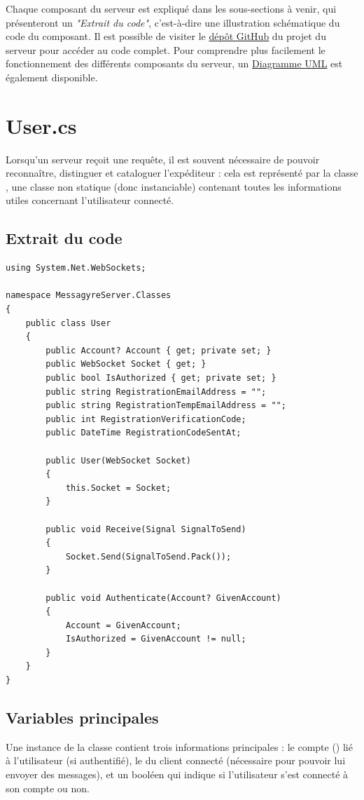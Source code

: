 \documentclass[12pt]{report}
\begin{document}
Chaque composant du serveur est expliqué dans les sous-sections à venir, qui présenteront un \textit{"Extrait du code"}, c’est-à-dire une illustration schématique du code du composant. Il est possible de visiter le \href{https://github.com/Gravi32/MessagyreServer.git}{dépôt GitHub} du projet du serveur pour accéder au code complet.
Pour comprendre plus facilement le fonctionnement des différents composants du serveur, un \href{https://lucid.app/lucidchart/b8dadd52-61fd-468b-8bd6-a81aa133eb02/edit?viewport_loc=-3637\%2C-1769\%2C9681\%2C4831\%2C0_0&invitationId=inv_fa22bca5-082d-4666-b827-15f4adaa3a38}{Diagramme UML} est également disponible.

\section{User.cs}

Lorsqu’un serveur reçoit une requête, il est souvent nécessaire de pouvoir reconnaître, distinguer et cataloguer l’expéditeur : cela est représenté par la classe , une classe non statique (donc instanciable) contenant toutes les informations utiles concernant l’utilisateur connecté.

\subsection{Extrait du code}
\begin{verbatim}
using System.Net.WebSockets;

namespace MessagyreServer.Classes
{
    public class User
    {
        public Account? Account { get; private set; }
        public WebSocket Socket { get; }
        public bool IsAuthorized { get; private set; }
        public string RegistrationEmailAddress = "";
        public string RegistrationTempEmailAddress = "";
        public int RegistrationVerificationCode;
        public DateTime RegistrationCodeSentAt;
        
        public User(WebSocket Socket)
        {
            this.Socket = Socket;
        }

        public void Receive(Signal SignalToSend)
        {
            Socket.Send(SignalToSend.Pack());
        }

        public void Authenticate(Account? GivenAccount)
        {
            Account = GivenAccount;
            IsAuthorized = GivenAccount != null;
        }
    }
}
\end{verbatim}

\subsection{Variables principales}
Une instance de la classe  contient trois informations principales : le compte () lié à l'utilisateur (si authentifié), le  du client connecté (nécessaire pour pouvoir lui envoyer des messages), et un booléen  qui indique si l'utilisateur s'est connecté à son compte ou non.
\end{document}

